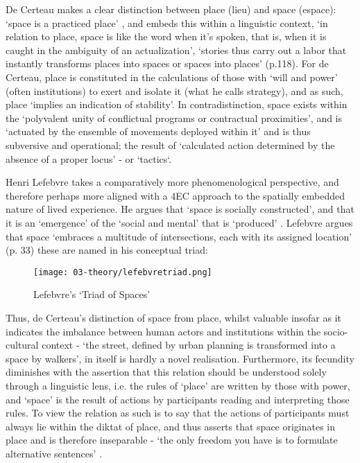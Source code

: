 De Certeau makes a clear distinction between place (lieu) and space (espace): `space is a practiced place' \citeyearpar[p. 117]{decerteau1984}, and embeds this within a linguistic context, `in relation to place, space is like the word when it's spoken, that is, when it is caught in the ambiguity of an actualization', `stories thus carry out a labor that instantly transforms places into spaces or spaces into places' (p.118). For de Certeau, place is constituted in the calculations of those with `will and power' (often institutions) to exert and isolate it (what he calls strategy), and as such, place `implies an indication of stability'. In contradistinction, space exists within the `polyvalent unity of conflictual programs or contractual proximities', and is `actuated by the ensemble of movements deployed within it' and is thus subversive and operational; the result of `calculated action determined by the absence of a proper locus' - or `tactics`. 

Henri Lefebvre takes a comparatively more phenomenological perspective, and therefore perhaps more aligned with a 4EC approach to the spatially embedded nature of lived experience. He argues that `space is socially constructed', and that it is an `emergence' of the `social and mental' that is `produced' \citeyearpar[p. 260]{lefebvre1991}. Lefebvre argues that space `embraces a multitude of intersections, each with its assigned location' (p. 33) these are named in his conceptual triad:

\begin{figure}[ht]
    \centering
    \texttt{[image: 03-theory/lefebvretriad.png]}
    \caption{Lefebvre's `Triad of Spaces' \citep[in][]{gunzel2019}}\label{fig: lefebvretriad}
\end{figure}

Thus, de Certeau's distinction of space from place, whilst valuable insofar as it indicates the imbalance between human actors and institutions within the socio-cultural context - `the street, defined by urban planning is transformed into a space by walkers', in itself is hardly a novel realisation. Furthermore, its fecundity diminishes with the assertion that this relation should be understood solely through a linguistic lens, i.e. the rules of `place' are written by those with power, and `space' is the result of actions by participants reading and interpreting those rules. To view the relation as such is to say that the actions of participants must always lie within the diktat of place, and thus asserts that space originates in place and is therefore inseparable - `the only freedom you have is to formulate alternative sentences' \citep{vermeulen2015}. 

